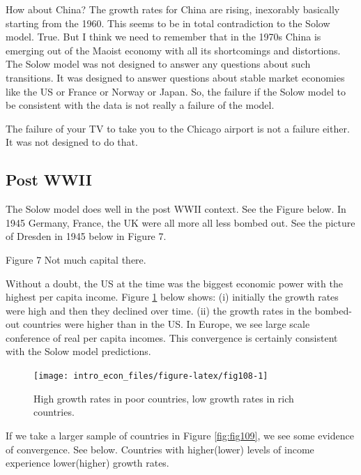 \documentclass[
]{book}
\begin{document}
How about China? The growth rates for China are rising, inexorably basically starting from the 1960. This seems to be in total contradiction to the Solow model. True. But I think we need to remember that in the 1970s China is emerging out of the Maoist economy with all its shortcomings and distortions. The Solow model was not designed to answer any questions about such transitions. It was designed to answer questions about stable market economies like the US or France or Norway or Japan. So, the failure if the Solow model to be consistent with the data is not really a failure of the model.

The failure of your TV to take you to the Chicago airport is not a failure either. It was not designed to do that.

\hypertarget{post-wwii}{%
\subsection{Post WWII}\label{post-wwii}}

The Solow model does well in the post WWII context. See the Figure below. In 1945 Germany, France, the UK were all more all less bombed out. See the picture of Dresden in 1945 below in Figure 7.

Figure 7 Not much capital there.

Without a doubt, the US at the time was the biggest economic power with the highest per capita income. Figure \ref{fig:fig108} below shows: (i) initially the growth rates were high and then they declined over time. (ii) the growth rates in the bombed-out countries were higher than in the US. In Europe, we see large scale conference of real per capita incomes. This convergence is certainly consistent with the Solow model predictions.

\begin{figure}

{\centering \texttt{[image: intro\_econ\_files/figure-latex/fig108-1]} 

}

\caption{High growth rates in poor countries, low growth rates in rich countries.}\label{fig:fig108}
\end{figure}

If we take a larger sample of countries in Figure \ref{fig:fig109}, we see some evidence of convergence. See below. Countries with higher(lower) levels of income experience lower(higher) growth rates.
\end{document}
